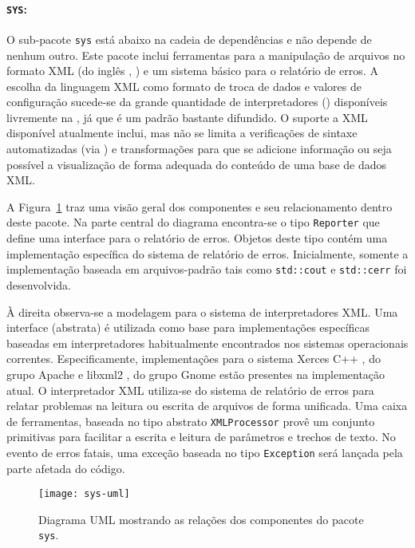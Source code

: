 \paragraph{\texttt{SYS}:} O sub-pacote \texttt{sys} está abaixo na cadeia de
dependências e não depende de nenhum outro. Este pacote inclui ferramentas
para a manipulação de arquivos no formato XML (do inglês
, \cite{xml}) e um sistema básico para
o relatório de erros. A escolha da linguagem XML como formato de troca de
dados e valores de configuração sucede-se da grande quantidade de
interpretadores () disponíveis livremente na , já
que é um padrão bastante difundido. O suporte a XML disponível atualmente
inclui, mas não se limita a verificações de sintaxe automatizadas (via
) e transformações para que se adicione informação ou seja
possível a visualização de forma adequada do conteúdo de uma base de dados
XML.

A Figura~\ref{fig:sys-uml} traz uma visão geral dos componentes e seu
relacionamento dentro deste pacote. Na parte central do diagrama encontra-se o
tipo \texttt{Reporter} que define uma interface para o relatório de
erros. Objetos deste tipo contém uma implementação específica do sistema de
relatório de erros. Inicialmente, somente a implementação baseada em
arquivos-padrão tais como \texttt{std::cout} e \texttt{std::cerr}
\cite{web:gcc-stl} foi desenvolvida. 

À direita observa-se a modelagem para o sistema de interpretadores XML. Uma
interface (abstrata) é utilizada como base para implementações específicas
baseadas em interpretadores habitualmente encontrados nos sistemas
operacionais correntes. Especificamente, implementações para o sistema Xerces
C++ \cite{xerces-c}, do grupo Apache e libxml2 \cite{libxml2}, do grupo Gnome
estão presentes na implementação atual. O interpretador XML utiliza-se do
sistema de relatório de erros para relatar problemas na leitura ou escrita de
arquivos de forma unificada. Uma caixa de ferramentas, baseada no tipo
abstrato \texttt{XMLProcessor} provê um conjunto primitivas para facilitar a
escrita e leitura de parâmetros e trechos de texto. No evento de erros fatais,
uma exceção baseada no tipo \texttt{Exception} será lançada pela parte afetada
do código.

\begin{figure}
\begin{center}
\texttt{[image: sys-uml]}
\end{center}
\caption{Diagrama UML mostrando as relações dos componentes do pacote
\texttt{sys}.}
\label{fig:sys-uml}
\end{figure}

